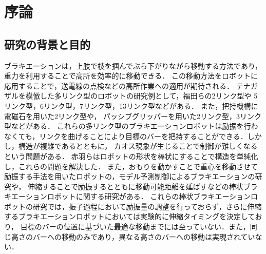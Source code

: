 \chapter[序論]%
        {序論}
        \section{研究の背景と目的}

          ブラキエーションは，上肢で枝を掴んでぶら下がりながら移動する方法であり，重力を利用することで高所を効率的に移動できる．
          この移動方法をロボットに応用することで\cite{福田敏男1990ブラキエーション形移動ロボットの研究}，送電線の点検などの高所作業への適用が期待される．
          テナガザルを模倣した多リンク型のロボットの研究例として，福田らの2リンク型\cite{福田敏男1991ブラキエーション形移動ロボットの研究2}\cite{福田敏男1992ブラキエーション形移動ロボットの研究}\cite{齋藤史倫1993ブラキエーション形移動ロボットの研究}\cite{齋藤史倫1995学習とロボット}\cite{福田敏男1996強化学習法を用いたファジィコントローラの生成}\cite{中西淳1998解析的手法による}\cite{中西淳19992}\cite{中西淳2001ハイブリッドコントローラによる}や
          5リンク型\cite{福田敏男1991ブラキエーション形移動ロボットの研究}，6リンク型\cite{福田敏男1990ブラキエーション形移動ロボットの研究}，7リンク型\cite{齋藤史倫1994ブラキエーション形移動ロボットの研究}，13リンク型\cite{長谷川泰久2001ブラキエーション形移動ロボットの研究}などがある．
          また，把持機構に電磁石を用いた2リンク型\cite{山川雄司2016ブラキエーションロボットの開発と運動生成}\cite{山川雄司2016-2ブラキエーションロボットの開発と運動生成}や，
          パッシブグリッパーを用いた2リンク型\cite{javadi2023acromonk}，3リンク型\cite{grama2024ricmonk}などがある．
          これらの多リンク型のブラキエーションロボットは励振を行わなくても，リンクを曲げることにより目標のバーを把持することができる．しかし，構造が複雑であるとともに，
          カオス現象\cite{鈴木三男2000二重振り子におけるカオス的振舞}が生じることで制御が難しくなるという問題がある．
          赤羽らはロボットの形状を棒状にすることで構造を単純化し，これらの問題を解決した\cite{akahane2022single}．
          また，おもりを動かすことで重心を移動させて励振する手法\cite{lieskovsky2023optimal}を用いたロボットの，モデル予測制御によるブラキエーションの研究\cite{Hijiri:Robomech2024-1}や，
          伸縮することで励振するとともに移動可能距離を延ばす\cite{Hijiri:Robomech2024}などの棒状ブラキエーションロボットに関する研究がある．
          これらの棒状ブラキエーションロボットの研究では，振子過程において励振量の調整を行っておらず，さらに伸縮するブラキエーションロボットにおいては実験的に伸縮タイミングを決定しており，
          目標のバーの位置に基づいた最適な移動までには至っていない．また，同じ高さのバーへの移動のみであり，異なる高さのバーへの移動は実現されていない．
          
